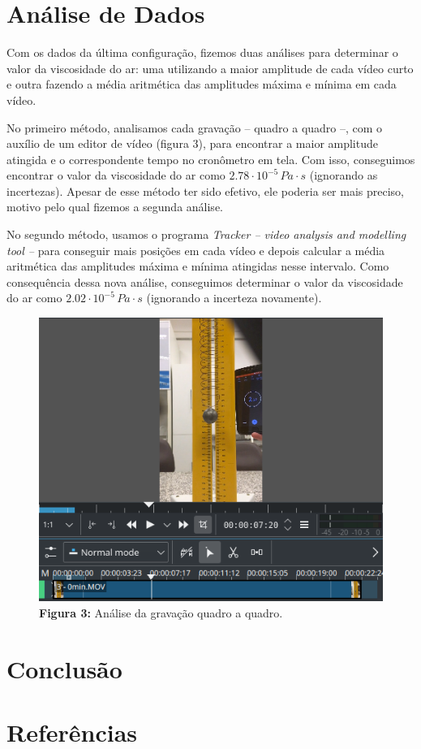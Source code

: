 \documentclass[a4paper, 12pt]{article}
\begin{document}
\begin{multicols}{2}
		\section{Análise de Dados}
		\label{sec:analise}
			\par Com os dados da última configuração, fizemos duas análises para determinar o valor da viscosidade do ar: uma utilizando a maior amplitude de cada vídeo curto e outra fazendo a média aritmética das amplitudes máxima e mínima em cada vídeo.
			\par No primeiro método, analisamos cada gravação -- quadro a quadro --, com o auxílio de um editor de vídeo (figura 3), para encontrar a maior amplitude atingida e o correspondente tempo no cronômetro em tela. Com isso, conseguimos encontrar o valor da viscosidade do ar como $2.78 \cdot 10^{-5} \, Pa \cdot s$ (ignorando as incertezas). Apesar de esse método ter sido efetivo, ele poderia ser mais preciso, motivo pelo qual fizemos a segunda análise.
			\par No segundo método, usamos o programa \textit{Tracker -- video analysis and modelling tool --} para conseguir mais posições em cada vídeo e depois calcular a média aritmética das amplitudes máxima e mínima atingidas nesse intervalo. Como consequência dessa nova análise, conseguimos determinar o valor da viscosidade do ar como $2.02 \cdot 10^{-5} \, Pa \cdot s$ (ignorando a incerteza novamente).
			\begin{figure}[H]
				\centering
				\includegraphics[scale=0.4]{./img/quadros.png}
				\captionsetup{labelformat=empty}
				\caption{\textbf{Figura 3:} Análise da gravação quadro a quadro.}
			\end{figure}
			
		\section{Conclusão}
		\label{sec:conclusao}
		
		\section{Referências}
		
	\end{multicols}
\end{document}
